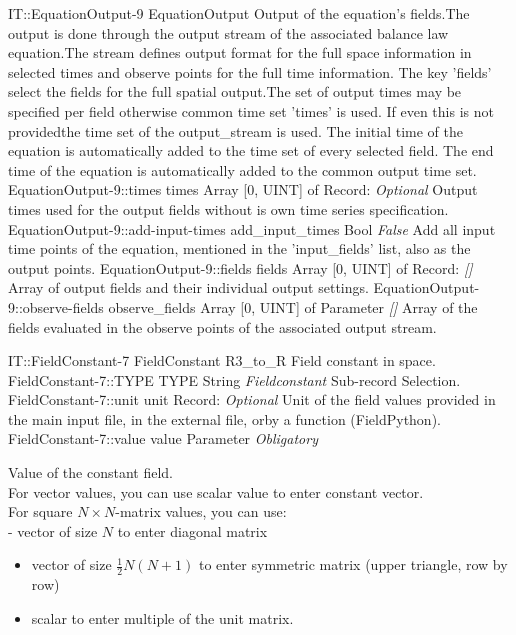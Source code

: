 \begin{RecordType}
	{IT::EquationOutput-9}
	{EquationOutput}
	{} %
	{} %
	{{{Output of the equation's fields.The output is done through the output stream of the associated balance law equation.The stream defines output format for the full space information in selected times and observe points for the full time information. The key 'fields' select the fields for the full spatial output.The set of output times may be specified  per field otherwise common time set 'times' is used. If even this is not providedthe time set of the output{\_}stream is used. The initial time of the equation is automatically added to the time set of every selected field. The end time of the equation is automatically added to the common output time set.}}}
		\RecKey
			{EquationOutput-9::times}
			{times}
			{{Array [0, UINT] of }{Record}{: }}
			{ \it{Optional} }
			{{{Output times used for the output fields without is own time series specification.}}}
		\RecKey
			{EquationOutput-9::add-input-times}
			{add{\_}input{\_}times}
			{{Bool}}
			{ \it{False} }
			{{{Add all input time points of the equation, mentioned in the 'input{\_}fields' list, also as the output points.}}}
		\RecKey
			{EquationOutput-9::fields}
			{fields}
			{{Array [0, UINT] of }{Record}{: }}
			{ \it{[]} }
			{{{Array of output fields and their individual output settings.}}}
		\RecKey
			{EquationOutput-9::observe-fields}
			{observe{\_}fields}
			{{Array [0, UINT] of }{Parameter}}
			{ \it{[]} }
			{{{Array of the fields evaluated in the observe points of the associated output stream.}}}
\end{RecordType}
\begin{RecordType}
	{IT::FieldConstant-7}
	{FieldConstant}
	{} %
	{} %
	{{{R3{\_}to{\_}R Field constant in space.}}}
		\RecKey
			{FieldConstant-7::TYPE}
			{TYPE}
			{{String}}
			{ \it{Fieldconstant} }
			{{{Sub-record Selection.}}}
		\RecKey
			{FieldConstant-7::unit}
			{unit}
			{{Record}{: }}
			{ \it{Optional} }
			{{{Unit of the field values provided in the main input file, in the external file, orby a function (FieldPython).}}}
		\RecKey
			{FieldConstant-7::value}
			{value}
			{{Parameter}}
			{ \it{Obligatory} }
			{{{{Value of the constant field.}\\{
For vector values, you can use scalar value to enter constant vector.}\\{
For square }{$N\times N$}{-matrix values, you can use:}\\{
 - vector of size }{$N$}{ to enter diagonal matrix}
}
\begin{itemize}
\item {vector of size }{$\frac12N(N+1)$}{ to enter symmetric matrix (upper triangle, row by row)}
\item {scalar to enter multiple of the unit matrix.}
\end{itemize}
}}
\end{RecordType}
